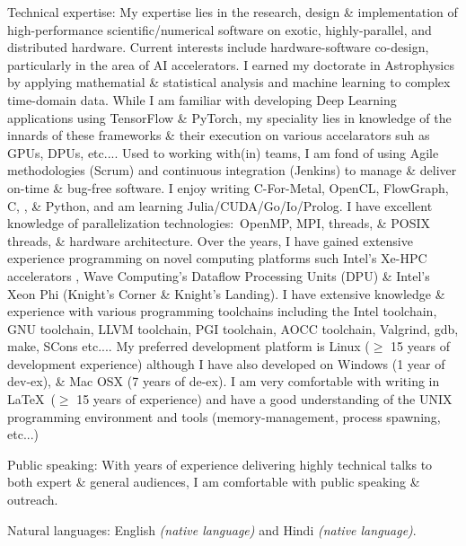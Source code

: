\documentclass[10pt,a4paper]{article}
\begin{document}
  \inlineheadsection  %
  {Technical expertise:}
  {My expertise lies in the research, design \& implementation of high-performance scientific/numerical software on exotic, highly-parallel, and distributed hardware. Current interests include hardware-software co-design, particularly in the area of AI accelerators. I earned my doctorate in Astrophysics by applying mathematial \& statistical analysis and machine learning to complex time-domain data. While I am familiar with developing Deep Learning applications using TensorFlow \& PyTorch, my speciality lies in knowledge of the innards of these frameworks \& their execution on various accelarators suh as GPUs, DPUs, etc.... Used to working with(in) teams, I am fond of using Agile methodologies (Scrum) and continuous integration (Jenkins) to manage \& deliver on-time \& bug-free software. I enjoy writing C-For-Metal, OpenCL, FlowGraph, C\nsp, \CPP\nsp, \& Python, and am learning Julia/\nsp CUDA/\nsp Go/\nsp Io/\nsp Prolog. I have excellent knowledge of parallelization technologies:\ OpenMP, MPI,  threads, \& POSIX threads, \& hardware architecture. Over the years, I have gained extensive experience programming on novel computing platforms such Intel's Xe-HPC accelerators , Wave Computing's Dataflow Processing Units (DPU) \& Intel's Xeon Phi (Knight's Corner \& Knight's Landing). I have extensive knowledge \& experience with various programming toolchains including the Intel toolchain, GNU toolchain, LLVM toolchain, PGI toolchain, AOCC toolchain, Valgrind, gdb, make, SCons etc.... My preferred development platform is Linux ($\geq$ 15 years of development experience) although I have also developed on Windows (1 year of dev-ex), \& Mac OSX (7 years of de-ex). I am very comfortable with writing in \LaTeX \ ($\geq$ 15 years of experience) and have a good understanding of the UNIX programming environment and tools (memory-management, process spawning, etc...)}

  \vspace{1.0em}

  \inlineheadsection
    {Public speaking:}
    {With years of experience delivering highly technical talks to both expert \& general audiences, I am comfortable with public speaking \& outreach.}

  \vspace{1.0em}

  \inlineheadsection
    {Natural languages:}
    {English \emph{(native language)} and Hindi \emph{(native language)}.}
\end{document}
